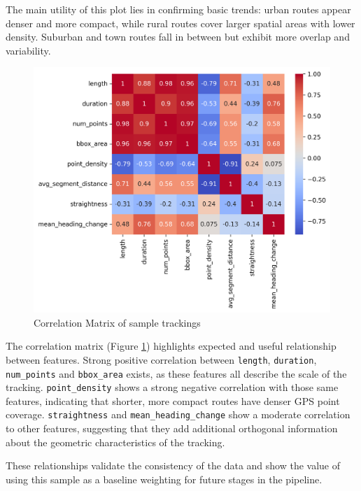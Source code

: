 \documentclass[a4paper,12pt,twoside]{scrreprt}
\begin{document}
The main utility of this plot lies in
confirming basic trends: urban routes appear denser and more compact, while
rural routes cover larger spatial areas with lower density. Suburban and town
routes fall in between but exhibit more overlap and variability.

\begin{figure}[htbp]
  \centering
  \includegraphics[width=\textwidth]{Figures/sample_correlation_matrix.png}
  \caption{Correlation Matrix of sample trackings}
  \label{fig:sample_correlation_matrix}
\end{figure}
\FloatBarrier

The correlation matrix (Figure \ref{fig:sample_correlation_matrix}) highlights
expected and useful relationship between features.
Strong positive correlation between \texttt{length}, \texttt{duration},
\texttt{num\_points} and \texttt{bbox\_area} exists, as these features all
describe the scale of the
tracking.
\texttt{point\_density} shows a strong negative correlation with those same
features, indicating that shorter, more compact routes have denser GPS point
coverage.
\texttt{straightness} and \texttt{mean\_heading\_change} show a moderate
correlation to other features, suggesting that they add additional orthogonal
information about the geometric characteristics of the tracking.

These relationships validate the consistency of the data and show the value of
using this sample as a baseline weighting for future stages in the pipeline.
\end{document}
